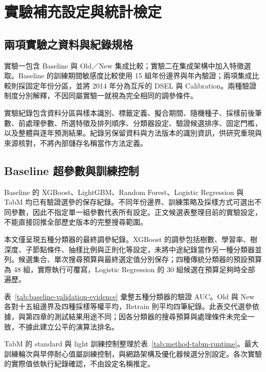 \chapter{實驗補充設定與統計檢定}\label{app:experimental-details}
\begingroup
\setlength{\emergencystretch}{2em}

\section{兩項實驗之資料與紀錄規格}

實驗一包含 Baseline 與 Old／New 集成比較；實驗二在集成架構中加入特徵選取。Baseline 的訓練期間敏感度比較使用 15 組年份邊界與年內驗證；兩項集成比較則採固定年份分區，並將 2014 年分為互斥的 DSEL 與 Calibration。兩種驗證制度分別解釋，不因同屬實驗一就視為完全相同的調參條件。

實驗紀錄包含資料分區與樣本識別、標籤定義、擬合期間、隨機種子、採樣前後筆數、前處理參數、所選特徵及排列順序、分類器設定、驗證候選排序、固定門檻，以及整體與逐年預測結果。紀錄另保留資料與方法版本的識別資訊，供研究重現與來源核對，不將內部儲存名稱當作方法定義。

\section{Baseline 超參數與訓練控制}

Baseline 的 XGBoost、LightGBM、Random Forest、Logistic Regression 與 TabM 均已有驗證選參的保存紀錄。不同年份邊界、訓練策略及採樣方式可選出不同參數，因此不指定單一組參數代表所有設定。正文候選表整理目前的實驗設定，不能直接回推全部歷史版本的完整搜尋範圍。

本文僅呈現五種分類器的最終調參紀錄。XGBoost 的調參包括樹數、學習率、樹深度、子節點條件、抽樣比例與正則化等設定，未將中途紀錄當作另一種分類器並列。候選集合、單次搜尋預算與最終選定值分別保存；四種傳統分類器的預設預算為 48 組，實際執行可覆寫，Logistic Regression 的 30 組候選在預算足夠時全部遍歷。

\clearpage


表~\ref{tab:baseline-validation-evidence} 彙整五種分類器的驗證 AUC。Old 與 New 各對十五組邊界及四種採樣等權平均，Retrain 則平均四筆紀錄。此表交代選參依據，與第四章的測試結果用途不同；因各分類器的搜尋預算與處理條件未完全一致，不據此建立公平的演算法排名。

TabM 的 standard 與 light 訓練控制整理於表~\ref{tab:method-tabm-runtime}。最大訓練輪次與早停耐心值屬訓練控制，與網路架構及優化器候選分別設定。各次實驗的實際值依執行紀錄確認，不由設定名稱推定。

